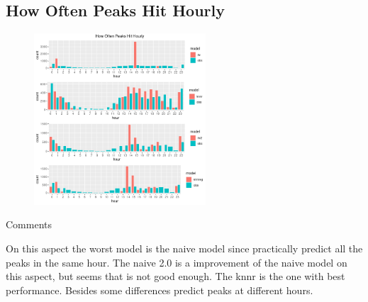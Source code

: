 \documentclass[xcolor=dvipsnames]{beamer}
\begin{document}
    \subsection{How Often Peaks Hit Hourly}
    \begin{frame}{}
        \begin{figure}
            \centering
                 \includegraphics[width=0.57\textwidth]{images/hourly.png}
       \end{figure}
    \end{frame}
    \begin{frame}{Comments}
        \begin{outline}
            \1 On this aspect the worst model is the naive model since practically predict all the peaks in the same hour.
                \2 The naive 2.0 is a improvement of the naive model on this aspect, but seems that is not good enough.
            \1 The knnr is the one with best performance. Besides some differences predict peaks at different hours.
        \end{outline}
        
    \end{frame}
\end{document}
